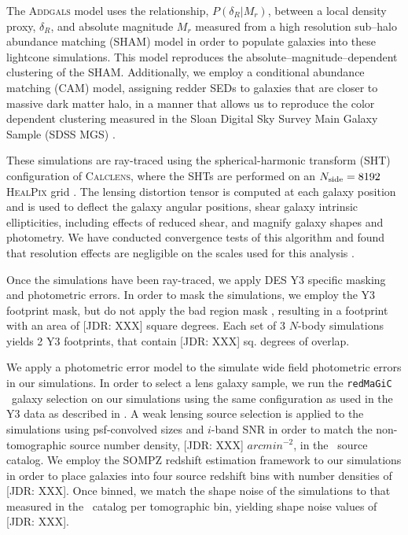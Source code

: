 \documentclass[fleqn,usenatbib]{mnras}
\newcommand{\redmagic}{\texttt{redMaGiC} }
\newcommand{\jdr}[1]{{\color{blue}[JDR: #1]}}
\begin{document}
The \textsc{Addgals} model uses the relationship, $P(\delta_{R}|M_r)$, between a local density proxy, $\delta_{R}$, and absolute magnitude $M_r$ measured from a high resolution sub--halo abundance matching (SHAM) model in order to populate galaxies into these lightcone simulations. This model reproduces the absolute--magnitude--dependent clustering of the SHAM. Additionally, we employ a conditional abundance matching (CAM) model, assigning redder SEDs to galaxies that are closer to massive dark matter halo, in a manner that allows us to reproduce the color dependent clustering measured in the Sloan Digital Sky Survey Main Galaxy Sample (SDSS MGS) \cite{Addgals, DeRose2020b}. 

These simulations are ray-traced using the spherical-harmonic transform (SHT) configuration of \textsc{Calclens}, where the SHTs are performed on an $N_{\rm side}=8192$ \textsc{HealPix} grid \citep{Becker2013}. The lensing distortion tensor is computed at each galaxy position and is used to deflect the galaxy angular positions, shear galaxy intrinsic ellipticities, including effects of reduced shear, and magnify galaxy shapes and photometry. We have conducted convergence tests of this algorithm and found that resolution effects are negligible on the scales used for this analysis \cite{DeRose2019}.

Once the simulations have been ray-traced, we apply DES Y3 specific masking and photometric errors. In order to mask the simulations, we employ the Y3 footprint mask, but do not apply the bad region mask \citep{y3gold}, resulting in a footprint with an area of \jdr{XXX} square degrees. Each set of 3 $N$-body simulations yields 2 Y3 footprints, that contain \jdr{XXX} sq. degrees of overlap.

We apply a photometric error model to the simulate wide field photometric errors in our simulations. In order to select a lens galaxy sample, we run the \redmagic\ galaxy selection on our simulations using the same configuration as used in the Y3 data as described in \citet{y3lens}. A weak lensing source selection is applied to the simulations using psf-convolved sizes and $i$-band SNR in order to match the non-tomographic source number density, \jdr{XXX} $arcmin^{-2}$, in the \metacal\ source catalog. We employ the SOMPZ redshift estimation framework to our simulations in order to place galaxies into four source redshift bins with number densities of \jdr{XXX}. Once binned, we match the shape noise of the simulations to that measured in the \metacal\ catalog per tomographic bin, yielding shape noise values of \jdr{XXX}.
\end{document}
